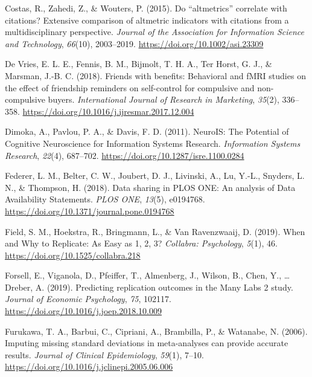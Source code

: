 \documentclass[
  english,
  man,floatsintext]{apa6}
\newlength{\cslhangindent}
\newlength{\cslentryspacingunit} %
\newenvironment{CSLReferences}[2] %
 {%
  \setlength{\parindent}{0pt}
  \ifodd #1
  \let\oldpar\par
  \def\par{\hangindent=\cslhangindent\oldpar}
  \fi
  \setlength{\parskip}{#2\cslentryspacingunit}
 }%
 {}
\begin{document}
\begin{CSLReferences}{1}{0}
\leavevmode{}%
Costas, R., Zahedi, Z., \& Wouters, P. (2015). Do {``altmetrics''} correlate with citations? {Extensive} comparison of altmetric indicators with citations from a multidisciplinary perspective. \emph{Journal of the Association for Information Science and Technology}, \emph{66}(10), 2003--2019. \url{https://doi.org/10.1002/asi.23309}

\leavevmode{}%
De Vries, E. L. E., Fennis, B. M., Bijmolt, T. H. A., Ter Horst, G. J., \& Marsman, J.-B. C. (2018). Friends with benefits: {Behavioral} and {fMRI} studies on the effect of friendship reminders on self-control for compulsive and non-compulsive buyers. \emph{International Journal of Research in Marketing}, \emph{35}(2), 336--358. \url{https://doi.org/10.1016/j.ijresmar.2017.12.004}

\leavevmode{}%
Dimoka, A., Pavlou, P. A., \& Davis, F. D. (2011). {NeuroIS}: {The Potential} of {Cognitive Neuroscience} for {Information Systems Research}. \emph{Information Systems Research}, \emph{22}(4), 687--702. \url{https://doi.org/10.1287/isre.1100.0284}

\leavevmode{}%
Federer, L. M., Belter, C. W., Joubert, D. J., Livinski, A., Lu, Y.-L., Snyders, L. N., \& Thompson, H. (2018). Data sharing in {PLOS ONE}: {An} analysis of {Data Availability Statements}. \emph{PLOS ONE}, \emph{13}(5), e0194768. \url{https://doi.org/10.1371/journal.pone.0194768}

\leavevmode{}%
Field, S. M., Hoekstra, R., Bringmann, L., \& Van Ravenzwaaij, D. (2019). When and {Why} to {Replicate}: {As Easy} as 1, 2, 3? \emph{Collabra: Psychology}, \emph{5}(1), 46. \url{https://doi.org/10.1525/collabra.218}

\leavevmode{}%
Forsell, E., Viganola, D., Pfeiffer, T., Almenberg, J., Wilson, B., Chen, Y., \ldots{} Dreber, A. (2019). Predicting replication outcomes in the {Many Labs} 2 study. \emph{Journal of Economic Psychology}, \emph{75}, 102117. \url{https://doi.org/10.1016/j.joep.2018.10.009}

\leavevmode{}%
Furukawa, T. A., Barbui, C., Cipriani, A., Brambilla, P., \& Watanabe, N. (2006). Imputing missing standard deviations in meta-analyses can provide accurate results. \emph{Journal of Clinical Epidemiology}, \emph{59}(1), 7--10. \url{https://doi.org/10.1016/j.jclinepi.2005.06.006}


\end{CSLReferences}
\end{document}

